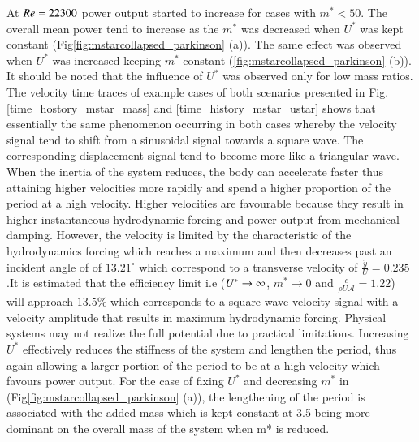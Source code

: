 At $Re=22300$ power output started to increase for cases with $m^*<50$. The overall mean power tend to increase as the $m^*$ was decreased when $U^*$ was kept constant (Fig\ref{fig:mstarcollapsed_parkinson} (a)). The same effect was observed when $U^*$ was increased keeping $m^*$ constant (\ref{fig:mstarcollapsed_parkinson} (b)). It should be noted that the influence of $U^*$ was observed only for low mass ratios.  The velocity time traces of example cases of both scenarios presented in Fig.\ref{time_hostory_mstar_mass} and \ref{time_history_mstar_ustar} shows that essentially the same phenomenon occurring in both cases whereby the velocity signal tend to shift from a sinusoidal signal towards a square wave. The corresponding displacement signal tend to become more like a triangular wave. When the inertia of the system reduces, the body can accelerate faster thus attaining higher velocities more rapidly and spend a higher proportion of the period at a high velocity. Higher velocities are favourable because they result in higher instantaneous hydrodynamic forcing and power output from mechanical damping. However, the velocity is limited by the characteristic of the hydrodynamics forcing which reaches a maximum and then decreases past an incident angle of of $13.21^{\circ}$ which correspond to a transverse velocity of $\frac{\dot{y}}{U}=0.235$.It is estimated that the efficiency limit i.e ($U^{*} \rightarrow \infty$, $m^* \rightarrow 0$ and $\frac{c}{\rho U \mathcal{A}}=1.22$) will approach $13.5\%$ which corresponds to a square wave velocity signal with a velocity amplitude that results in maximum  hydrodynamic forcing. Physical systems may not realize the full potential due to practical limitations. Increasing $U^*$ effectively reduces the stiffness of the system and lengthen the period, thus again allowing a larger portion of the period to be at a high velocity which favours power output. For the case of fixing $U^*$ and decreasing $m^*$ in (Fig\ref{fig:mstarcollapsed_parkinson} (a)), the lengthening of the period is associated with the added mass which is kept constant at 3.5 being more dominant on the overall mass of the system when m* is reduced.




